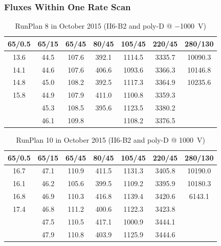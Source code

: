 \documentclass[9pt]{beamer}
\begin{document}
\begin{frame}
	\frametitle{Fluxes Within One Rate Scan}
	\begin{table}[t]
		\small
		\begin{tabular}{c|c|c|c|c|c|c}
			\toprule
			65/0.5	& 65/15	& 65/45	& 80/45	& 105/45	& 220/45	& 280/130\\\hline
			13.6	& 44.5	& 107.6	& 392.1	& 1114.5	& 3335.7	& 10090.3\\
			14.1	& 44.6	& 107.6	& 406.6	& 1093.6	& 3366.3	& 10146.8\\
			14.8	& 45.0	& 108.2	& 392.5	& 1117.3	& 3364.9	& 10235.6\\
			15.8	& 44.9	& 107.9	& 411.0	& 1100.8	& 3359.3	& \\
					& 45.3	& 108.5	& 395.6	& 1123.5	& 3380.2	& \\
					& 46.1	& 109.8	& 		& 1108.2	& 3376.5	& \\
			\bottomrule
		\end{tabular}\s
		\caption{RunPlan 8 in October 2015 (II6-B2 and poly-D @ \SI{-1000}{V})}
	\end{table}

	\begin{table}[t]
		\small
		\begin{tabular}{c|c|c|c|c|c|c}
			\toprule
			65/0.5	& 65/15	& 65/45	& 80/45	& 105/45	& 220/45	& 280/130\\\hline
			16.7	& 47.1	& 110.9	& 411.5	& 1131.3	& 3405.8	& 10190.0\\
			16.1	& 46.2	& 105.6	& 399.5	& 1109.2	& 3395.9	& 10180.3\\
			16.8	& 46.9	& 110.3	& 416.8	& 1139.4	& 3420.6	& 6143.1\\
			17.4	& 46.8	& 111.2	& 400.6	& 1122.3	& 3423.8	& \\
					& 47.5	& 110.5	& 417.1	& 1000.9	& 3444.1	& \\
					& 47.9	& 110.8	& 403.9	& 1125.9	& 3444.6	& \\
			\bottomrule
		\end{tabular}
		\caption{RunPlan 10 in October 2015 (II6-B2 and poly-D @ \SI{1000}{V})}
	\end{table}
\end{frame}
\end{document}
